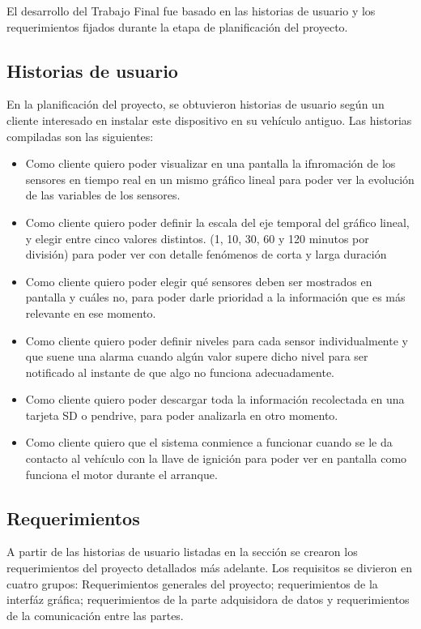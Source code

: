 El desarrollo del Trabajo Final fue basado en las historias de usuario y los requerimientos fijados durante la etapa de planificación del proyecto.

\subsection{Historias de usuario}

En la planificación del proyecto, se obtuvieron historias de usuario según un cliente interesado en instalar este dispositivo en su vehículo antiguo. Las historias compiladas son las siguientes:

\begin{itemize}
\item Como cliente quiero poder visualizar en una pantalla la ifnromación de los sensores en tiempo real en un mismo gráfico lineal para poder ver la evolución de las variables de los sensores.
\item Como cliente quiero poder definir la escala del eje temporal del gráfico lineal, y elegir entre cinco valores distintos. (1, 10, 30, 60 y 120 minutos por división) para poder ver con detalle fenómenos de corta y larga duración
\item Como cliente quiero poder elegir qué sensores deben ser mostrados en pantalla y cuáles no, para poder darle prioridad a la información que es más relevante en ese momento.
\item Como cliente quiero poder definir niveles para cada sensor individualmente y que suene una alarma cuando algún valor supere dicho nivel para ser notificado al instante de que algo no funciona adecuadamente.
\item Como cliente quiero poder descargar toda la información recolectada en una tarjeta SD o pendrive, para poder analizarla en otro momento.
\item Como cliente quiero que el sistema conmience a funcionar cuando se le da contacto al vehículo con la llave de ignición para poder ver en pantalla como funciona el motor durante el arranque.
\end{itemize}

\subsection{Requerimientos}

A partir de las historias de usuario listadas en la sección  se crearon los requerimientos del proyecto detallados más adelante. Los requisitos se divieron en cuatro grupos: Requerimientos generales del proyecto; requerimientos de la interfáz gráfica; requerimientos de la parte adquisidora de datos y requerimientos de la comunicación entre las partes.

